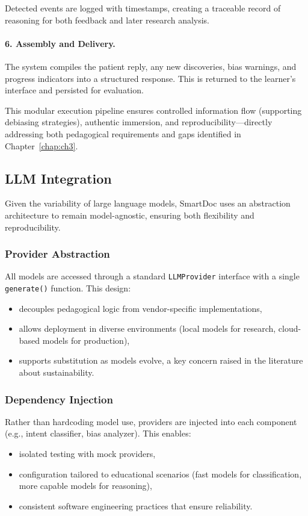 Detected events are logged with timestamps, creating a traceable record of reasoning
for both feedback and later research analysis.

\paragraph{6. Assembly and Delivery.}
The system compiles the patient reply, any new discoveries, bias warnings, and
progress indicators into a structured response. This is returned to the learner’s
interface and persisted for evaluation.

\medskip
This modular execution pipeline ensures controlled information flow (supporting
debiasing strategies), authentic immersion, and reproducibility—directly addressing
both pedagogical requirements and gaps identified in Chapter~\ref{chap:ch3}.

\subsection{LLM Integration}
\label{sec:llm_integration}

Given the variability of large language models, SmartDoc uses an abstraction
architecture to remain model-agnostic, ensuring both flexibility and reproducibility.

\subsubsection{Provider Abstraction}
All models are accessed through a standard \texttt{LLMProvider} interface with a
single \texttt{generate()} function. This design:
\begin{itemize}
    \item decouples pedagogical logic from vendor-specific implementations,
    \item allows deployment in diverse environments (local models for research,
    cloud-based models for production),
    \item supports substitution as models evolve, a key concern raised in the
    literature about sustainability.
\end{itemize}

\subsubsection{Dependency Injection}
Rather than hardcoding model use, providers are injected into each component
(e.g., intent classifier, bias analyzer). This enables:
\begin{itemize}
    \item isolated testing with mock providers,
    \item configuration tailored to educational scenarios (fast models for
    classification, more capable models for reasoning),
    \item consistent software engineering practices that ensure reliability.
\end{itemize}

